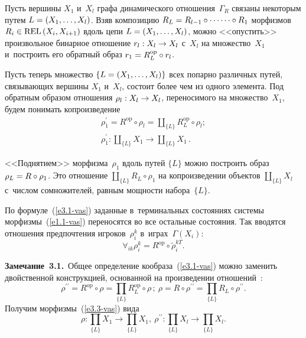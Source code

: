 \begin{multicols}{2}
    
    Пусть вершины $X_1$ и~$X_l$ графа динамического отношения~$\Gamma_R$ 
связаны некоторым путем $L\hm= (X_1, \ldots, X_l)$. Взяв композицию $R_L\hm= 
R_{l-1}\circ\cdots\linebreak \cdots \circ R_1$ морфизмов $R_i\hm \in \mathrm{REL}\,(X_i, X_{i+1})$ вдоль цепи
$L\hm= (X_1, \ldots , X_l)$, мож\-но <<опустить>> произвольное бинарное отношение 
$r_l: X_l\hm\to X_l$ с~$X_l$ на множество~$X_1$ и~по\-стро\-ить его обратный образ 
$r_1\hm= R_L^{\mathrm{op}} \circ r_l$.
    
    Пусть теперь множество $\{ L\hm= (X_1, \ldots , X_l)\}$ всех попарно 
различных путей, свя\-зы\-ва\-ющих вершины $X_1$ и~$X_l$, состоит более чем из одного 
элемента. Под обратным образом отношения $\rho_l: X_l\hm\to X_l$, переносимого 
на множество~$X_1$, будем понимать копроизведение
    \begin{multline}
    \rho_1^\prime =R^{\mathrm{op}}\circ \rho_l =\coprod\limits_{\{L\}} R_L^{\mathrm{op}} \circ 
\rho_l;\\
 \rho_1^\prime: \coprod\limits_{\{ L\}} X_1\to \coprod\limits_{\{L\}} X_1\,.
    \label{e3.1-vas}
    \end{multline}
    
    <<Поднятием>> морфизма~$\rho_1$ вдоль путей $\{L\}$ мож\-но по\-стро\-ить 
образ $\rho_L\hm= R\circ \rho_1$. Это отношение $\coprod_{\{L\}} R_L\circ \rho_1$ на 
копроизведении объектов $\coprod_{\{L\}} X_l$ с~числом сомножителей, рав\-ным 
мощ\-ности набора~$\{L\}$.
    
    По формуле~(\ref{e3.1-vas}) заданные в~терминальных со\-сто\-яни\-ях сис\-те\-мы 
морфизмы~(\ref{e1.1-vas}) переносятся во все остальные со\-сто\-яния. Так вводятся 
отношения предпочтения игроков~$\rho_i^k$ в~играх~$\Gamma(X_i)$:
    \begin{equation*}
    \forall_{ik} \rho_i^k =R^{\mathrm{op}}\circ \tilde{\rho}_i^{kT}.
    \end{equation*}
    
    \noindent
    \textbf{Замечание~3.1.}\ Общее определение кообраза~(\ref{e3.1-vas}) мож\-но 
заменить двойственной конструкцией, основанной на произведении 
отношений~\cite{11-vas}: 
    \begin{equation}
    \rho^{\prime\prime} \!=\!R^{\mathrm{op}} \circ \rho \!=\!\prod\limits_{\{L\}} R^{\mathrm{op}}_L \circ \rho\,;\ \rho\! =\!R\circ \rho^{\prime\prime}= 
\prod\limits_{\{L\}} R_L\circ \rho^{\prime\prime}\!.\!
    \label{e3.3-vas}
    \end{equation}
Получим морфизмы~(\ref{e3.3-vas}) вида 
$$
\rho: \prod\limits_{\{L\}} X_1\to \prod\limits_{\{L\}} X_1,\ \rho^{\prime\prime}: \prod\limits_{\{L\}} X_l\to \prod\limits _{\{L\}} X_l.
$$


\end{multicols}

